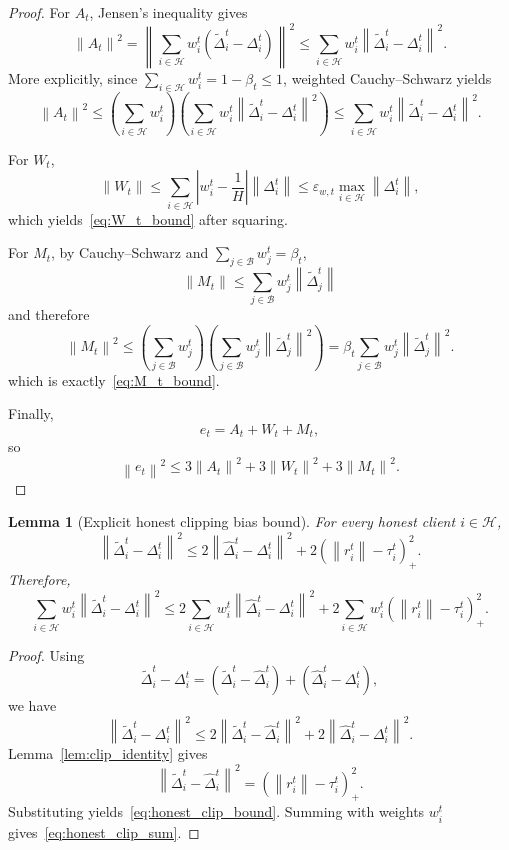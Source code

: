 \documentclass[11pt,a4paper]{article}
\newtheorem{lemma}{Lemma}
\theoremstyle{remark}
\newcommand{\HH}{\mathcal{H}}
\newcommand{\BB}{\mathcal{B}}
\newcommand{\norm}[1]{\left\lVert #1 \right\rVert}
\newcommand{\abs}[1]{\left\lvert #1 \right\rvert}
\begin{document}
\begin{proof}
For \(A_t\), Jensen's inequality gives
\[
    \norm{A_t}^2
    =
    \left\|
        \sum_{i \in \HH} w_i^t(\tilde{\Delta}_i^t-\Delta_i^t)
    \right\|^2
    \le
    \sum_{i \in \HH} w_i^t \norm{\tilde{\Delta}_i^t-\Delta_i^t}^2.
\]
More explicitly, since \(\sum_{i\in\HH} w_i^t = 1-\beta_t \le 1\),
weighted Cauchy--Schwarz yields
\[
    \norm{A_t}^2
    \le
    \left(\sum_{i\in\HH} w_i^t\right)
    \left(\sum_{i\in\HH} w_i^t \norm{\tilde{\Delta}_i^t-\Delta_i^t}^2\right)
    \le
    \sum_{i\in\HH} w_i^t \norm{\tilde{\Delta}_i^t-\Delta_i^t}^2.
\]

For \(W_t\),
\[
    \norm{W_t}
    \le
    \sum_{i \in \HH}
    \abs{w_i^t-\frac{1}{H}} \norm{\Delta_i^t}
    \le
    \varepsilon_{w,t} \max_{i\in\HH}\norm{\Delta_i^t},
\]
which yields~\eqref{eq:W_t_bound} after squaring.

For \(M_t\), by Cauchy--Schwarz and \(\sum_{j\in\BB}w_j^t=\beta_t\),
\[
    \norm{M_t}
    \le
    \sum_{j\in\BB} w_j^t \norm{\tilde{\Delta}_j^t}
\]
and therefore
\[
    \norm{M_t}^2
    \le
    \left(\sum_{j\in\BB}w_j^t\right)
    \left(\sum_{j\in\BB}w_j^t\norm{\tilde{\Delta}_j^t}^2\right)
    =
    \beta_t\sum_{j\in\BB}w_j^t\norm{\tilde{\Delta}_j^t}^2.
\]
which is exactly~\eqref{eq:M_t_bound}.

Finally,
\[
    e_t = A_t + W_t + M_t,
\]
so
\[
    \norm{e_t}^2
    \le
    3\norm{A_t}^2 + 3\norm{W_t}^2 + 3\norm{M_t}^2.
\]
\end{proof}

\begin{lemma}[Explicit honest clipping bias bound]
\label{lem:honest_clip}
For every honest client \(i \in \HH\),
\begin{equation}
    \norm{\tilde{\Delta}_i^t-\Delta_i^t}^2
    \le
    2\norm{\hat{\Delta}_i^t-\Delta_i^t}^2
    +
    2(\norm{r_i^t}-\tau_i^t)_+^2.
    \label{eq:honest_clip_bound}
\end{equation}
Therefore,
\begin{equation}
    \sum_{i \in \HH} w_i^t \norm{\tilde{\Delta}_i^t-\Delta_i^t}^2
    \le
    2\sum_{i \in \HH} w_i^t \norm{\hat{\Delta}_i^t-\Delta_i^t}^2
    +
    2\sum_{i \in \HH} w_i^t (\norm{r_i^t}-\tau_i^t)_+^2.
    \label{eq:honest_clip_sum}
\end{equation}
\end{lemma}

\begin{proof}
Using
\[
    \tilde{\Delta}_i^t-\Delta_i^t
    =
    (\tilde{\Delta}_i^t-\hat{\Delta}_i^t)
    +
    (\hat{\Delta}_i^t-\Delta_i^t),
\]
we have
\[
    \norm{\tilde{\Delta}_i^t-\Delta_i^t}^2
    \le
    2\norm{\tilde{\Delta}_i^t-\hat{\Delta}_i^t}^2
    +
    2\norm{\hat{\Delta}_i^t-\Delta_i^t}^2.
\]
Lemma~\ref{lem:clip_identity} gives
\[
    \norm{\tilde{\Delta}_i^t-\hat{\Delta}_i^t}^2
    =
    (\norm{r_i^t}-\tau_i^t)_+^2.
\]
Substituting yields~\eqref{eq:honest_clip_bound}. Summing with weights
\(w_i^t\) gives~\eqref{eq:honest_clip_sum}.
\end{proof}
\end{document}
